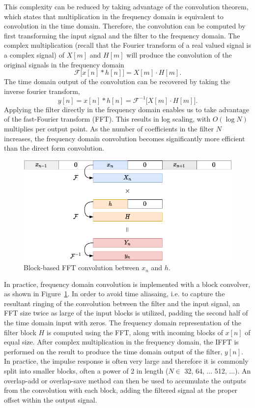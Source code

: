 \documentclass{article}
\begin{document}
This complexity can be reduced by taking advantage of the convolution theorem,
which states that multiplication in the frequency domain is equivalent to convolution in the time domain. 
Therefore, the convolution can be computed by first transforming the input signal and the filter to the frequency domain. 
The complex multiplication (recall that the Fourier transform of a real valued signal is a complex signal) 
of $X[m]$ and $H[m]$ will produce the convolution of the original signals in the frequency domain
\begin{equation*}
    \mathcal{F}\big[ x[n] * h[n] \big] = X[m] \cdot H[m].
\end{equation*}
The time domain output of the convolution can be recovered by taking the inverse fourier transform,
\begin{equation*}
    y[n] =  x[n] * h[n] = \mathcal{F}^{-1}\big[ X[m] \cdot H[m] \big].
\end{equation*}
Applying the filter directly in the frequency domain enables us to take advantage of the fast-Fourier transform (FFT). 
This results in log scaling, with $O(\log N)$ multiplies per output point.
As the number of coefficients in the filter $N$ increases, the frequency domain convolution becomes significantly more efficient than the direct form convolution. 

\begin{figure}
    \centering
    \includegraphics[width=0.7\linewidth]{figures/block-conv.pdf}
    \caption{Block-based FFT convolution between $x_n$ and $h$.}
    \label{fig:block-conv}
\end{figure}

In practice, frequency domain convolution is implemented with a block convolver, as shown in Figure~\ref{fig:block-conv}.
In order to avoid time aliasaing, i.e. to capture the resultant ringing of the convolution between the filter and the input signal, 
an FFT size twice as large of the input blocks is utilized, padding the second half of the time domain input with zeros. 
The frequency domain representation of the filter block $H$ is computed using the FFT, along with incoming blocks of $x[n]$ of equal size.
After complex multiplication in the frequency domain,
the IFFT is performed on the result to produce the time domain output of the filter, $y[n]$. 
In practice, the impulse response is often very large and therefore it is commonly split into smaller 
blocks, often a power of 2 in length ($N \in$ 32, 64, ... 512, ...). 
An overlap-add or overlap-save method can then be used to accumulate the outputs from the convolution with each block, 
adding the filtered signal at the proper offset within the output signal.
\end{document}
